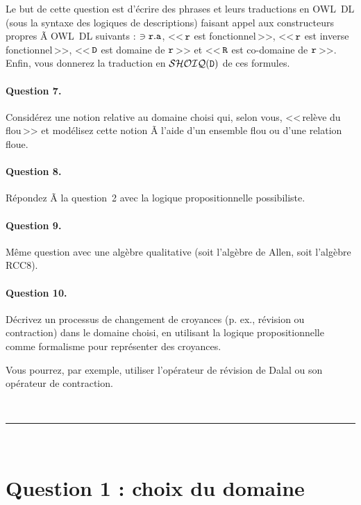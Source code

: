\documentclass[11pt, a4paper]{article}
\def\fm#1{\text{\texttt{#1}}}
\def\SHOIQD{{\mathcal{SHOIQ}}(\fm{D})}
\def\roleR{\fm{r}}
\def\instanceA{\fm{a}}
\def\conceptD{\fm{D}}
\def\conceptR{\fm{R}}
\begin{document}
	Le but de cette question est d'écrire des phrases et leurs traductions en
	OWL~DL (sous la syntaxe des logiques de descriptions) faisant appel aux
	constructeurs propres Ã  OWL~DL suivants :
	$\ni\roleR.\instanceA$,
	<<\,$\roleR$ est fonctionnel\,>>,
	<<\,$\roleR$ est inverse fonctionnel\,>>,
	<<\,$\conceptD$ est domaine de $\roleR$\,>> et
	<<\,$\conceptR$ est co-domaine de $\roleR$\,>>.
	Enfin, vous donnerez la traduction en $\SHOIQD$ de ces formules.
	
	\paragraph{Question 7.}
	Considérez une notion relative au domaine choisi qui, selon vous,
	<<\,relève du flou\,>> et modélisez cette notion Ã  l'aide d'un
	ensemble flou ou d'une relation floue.
	
	\paragraph{Question 8.}
	Répondez Ã  la question~2 avec la logique propositionnelle
	possibiliste.
	
	\paragraph{Question 9.}
	Même question avec une algèbre qualitative
	(soit l'algèbre de Allen, soit l'algèbre RCC8).
	
	\paragraph{Question 10.}
	Décrivez un processus de changement de croyances
	(p. ex., révision ou contraction) dans le domaine choisi,
	en utilisant la logique propositionnelle comme formalisme
	pour représenter des croyances.
	
	Vous pourrez, par exemple, utiliser l'opérateur de révision
	de Dalal ou son opérateur de contraction.
	
	\strut\\
	\hrule
	\strut\\[-4mm]
	
	\section*{Question 1 : choix du domaine}
	
\end{document}
